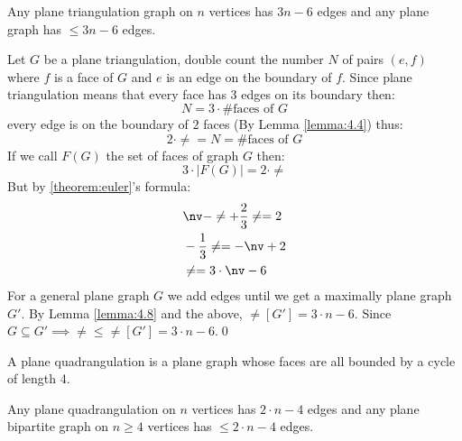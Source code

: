\begin{customcorollary}{4.9}
\label{corollary:4.9}
    Any plane triangulation graph on $n$ vertices has $3n - 6$ edges and any plane graph has $\leq 3n - 6$ edges.
\end{customcorollary}
\begin{prf}
    Let $G$ be a plane triangulation, double count the number $N$ of pairs $(e, f)$ where $f$ is a face of $G$ and $e$ is an edge on the boundary of $f$. Since plane triangulation means that every face has $3$ edges on its boundary then:
    \begin{equation*}
        N = 3 \cdot \text{\# faces of $G$}
    \end{equation*}
    every edge is on the boundary of $2$ faces (By Lemma \ref{lemma:4.4}) thus:
    \begin{equation*}
        2 \cdot \ne = N = \text{\# faces of $G$}
    \end{equation*}
    If we call $F(G)$ the set of faces of graph $G$ then:
    \begin{equation*}
        3 \cdot |F(G)| = 2 \cdot \ne
    \end{equation*}
    But by \ref{theorem:euler}'s formula:
    \begin{align*}
        &\nv - \ne + \frac{2}{3}\ne = 2 \\
        &- \frac{1}{3}\ne = -\nv + 2 \\
        &\ne = 3 \cdot \nv - 6
    \end{align*}
    For a general plane graph $G$ we add edges until we get a maximally plane graph $G'$. By Lemma \ref{lemma:4.8} and the above, $\ne[G'] = 3 \cdot n - 6$. Since $G \subseteq G' \implies \ne \leq \ne[G'] = 3 \cdot n - 6$.\qed
\end{prf}
\begin{definition}
    A plane quadrangulation is a plane graph whose faces are all bounded by a cycle of length 4.
\end{definition}
\begin{customcorollary}{4.10}
\label{corollary:4.10}
    Any plane quadrangulation on $n$ vertices has $2 \cdot n - 4$ edges and any plane bipartite graph on $n \geq 4$ vertices has $\leq 2 \cdot n - 4$ edges.
\end{customcorollary}
